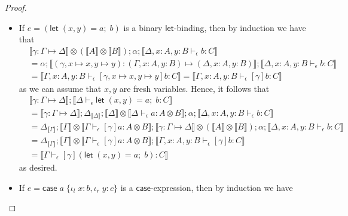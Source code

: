 \documentclass[acmsmall,screen,review]{acmart}
\newcommand{\ms}[1]{\ensuremath{\mathsf{#1}}}
\newcommand{\lto}{:}
\newcommand{\linl}[1]{\iota_l\;{#1}}
\newcommand{\linr}[1]{\iota_r\;{#1}}
\newcommand{\letexpr}[3]{\ensuremath{\ms{let}\;#1 = #2;\;#3}}
\newcommand{\caseexpr}[5]{\ms{case}\;#1\;\{\linl{#2} \lto #3, \linr{#4} \lto #5\}}
\newcommand{\bhyp}[2]{#1 : #2}
\newcommand{\hasty}[4]{#1 \vdash_{#2} #3: {#4}}
\newcommand{\issubst}[3]{#1: #2 \mapsto #3}
\newcommand{\dnt}[1]{\llbracket{#1}\rrbracket}
\begin{document}
\begin{proof}
\begin{itemize}[leftmargin=*]
    \item If $e = (\letexpr{(x, y)}{a}{b})$ is a binary \ms{let}-binding, then by induction we have
    that
    \begin{equation}
      \begin{aligned}
      & \dnt{\issubst{\gamma}{\Gamma}{\Delta}} \otimes (\dnt{A} \otimes \dnt{B}) 
          ; \alpha ; \dnt{\hasty{\Delta, \bhyp{x}{A}, \bhyp{y}{B}}{\epsilon}{b}{C}}
      \\ &= \alpha ; \dnt{\issubst{(\gamma, x \mapsto x, y \mapsto y)}
        {(\Gamma, \bhyp{x}{A}, \bhyp{y}{B})}{(\Delta, \bhyp{x}{A}, \bhyp{y}{B})}}
          ; \dnt{\hasty{\Delta, \bhyp{x}{A}, \bhyp{y}{B}}{\epsilon}{b}{C}}
      \\ &= \dnt{\hasty{\Gamma, \bhyp{x}{A}, \bhyp{y}{B}}
                        {\epsilon}{[\gamma, x \mapsto x, y \mapsto y]b}{C}}
          = \dnt{\hasty{\Gamma, \bhyp{x}{A}, \bhyp{y}{B}}{\epsilon}{[\gamma]b}{C}}
      \end{aligned}
    \end{equation}
    as we can assume that $x, y$ are fresh variables. Hence, it follows that
    \begin{equation}
      \begin{aligned}
        & \dnt{\issubst{\gamma}{\Gamma}{\Delta}} 
        ; \dnt{\hasty{\Delta}{\epsilon}{\letexpr{(x, y)}{a}{b}}{C}} \\
        &= \dnt{\issubst{\gamma}{\Gamma}{\Delta}}
        ; \Delta_{\dnt{\Delta}} 
        ; \dnt{\Delta} \otimes \dnt{\hasty{\Delta}{\epsilon}{a}{A \otimes B}}
        ; \alpha ; \dnt{\hasty{\Delta, \bhyp{x}{A}, \bhyp{y}{B}}{\epsilon}{b}{C}} \\
        &= \Delta_{\dnt{\Gamma}} 
        ; \dnt{\Gamma} \otimes \dnt{\hasty{\Gamma}{\epsilon}{[\gamma]a}{A \otimes B}}
        ; \dnt{\issubst{\gamma}{\Gamma}{\Delta}} \otimes (\dnt{A} \otimes \dnt{B}) ; \alpha
        ; \dnt{\hasty{\Delta, \bhyp{x}{A}, \bhyp{y}{B}}{\epsilon}{b}{C}} \\
        &= \Delta_{\dnt{\Gamma}}
        ; \dnt{\Gamma} \otimes \dnt{\hasty{\Gamma}{\epsilon}{[\gamma]a}{A \otimes B}}
        ; \dnt{\hasty{\Gamma, \bhyp{x}{A}, \bhyp{y}{B}}{\epsilon}{[\gamma]b}{C}} \\
        &= \dnt{\hasty{\Gamma}{\epsilon}{[\gamma](\letexpr{(x, y)}{a}{b})}{C}}
      \end{aligned}
    \end{equation}
    as desired.
    \item If $e = \caseexpr{a}{x}{b}{y}{c}$ is a \ms{case}-expression, then by induction we have

\end{itemize}
\end{proof}
\end{document}
